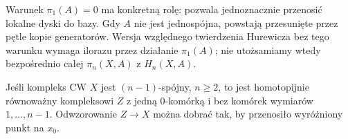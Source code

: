 \begin{uwaga}
Warunek $\pi_1(A)=0$ ma
konkretną rolę: pozwala
jednoznacznie przenosić
lokalne dyski do bazy.
Gdy $A$ nie jest
jednospójna, powstają
przesunięte przez pętle
kopie generatorów.
Wersja względnego
twierdzenia Hurewicza
bez tego warunku
wymaga ilorazu przez
działanie $\pi_1(A)$;
nie utożsamiamy wtedy
bezpośrednio całej
$\pi_n(X,A)$ z
$H_n(X,A)$.
\end{uwaga}

\begin{lemat}
\label{lem:model-wysoko-spojny}
Jeśli kompleks CW $X$
jest $(n-1)$-spójny,
$n\geq2$, to jest
homotopijnie równoważny
kompleksowi $Z$ z
jedną $0$-komórką
i bez komórek
wymiarów $1,\ldots,n-1$.
Odwzorowanie $Z\to X$
można dobrać tak,
by przenosiło
wyróżniony punkt
na $x_0$.
\end{lemat}
